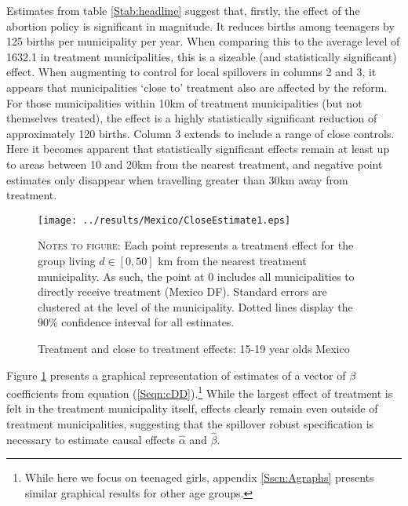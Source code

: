 \documentclass{article}
\begin{document}
\begin{spacing}{1.1}


Estimates from table \ref{Stab:headline} suggest that, firstly, the effect of
the abortion policy is significant in magnitude.  It reduces births among 
teenagers by 125 births per municipality per year. When comparing this to the
average level of 1632.1 in treatment municipalities, this is a sizeable (and
statistically significant) effect.  When augmenting to control for local
spillovers in columns 2 and 3, it appears that municipalities `close to' 
treatment also are affected by the reform.  For those municipalities within
10km of treatment municipalities (but not themselves treated), the effect is 
a highly statistically significant reduction of approximately 120 births.
Column 3 extends to include a range of close controls.  Here it becomes
apparent that statistically significant effects remain at least up to areas
between 10 and 20km from the nearest treatment, and negative point estimates
only disappear when travelling greater than 30km away from treatment.

\begin{figure}[htpb!]
\texttt{[image: ../results/Mexico/CloseEstimate1.eps]}
\caption{Treatment and close to treatment effects: 15-19 year olds Mexico}
\label{SFig:MexClose}
\vspace{2mm}
\begin{footnotesize}
\textsc{Notes to figure}: Each point represents a treatment effect for the group
living $d\in [0,50]$ km from the nearest treatment municipality.  As such, the
point at 0 includes all municipalities to directly receive treatment (Mexico DF).
Standard errors are clustered at the level of the municipality.  Dotted lines 
display the 90\% confidence interval for all estimates.
\end{footnotesize}
\end{figure}
Figure \ref{SFig:MexClose} presents a graphical representation of estimates
of a vector of $\beta$ coefficients from equation (\ref{Seqn:cDD}).\footnote{
While here we focus on teenaged girls, appendix \ref{Sscn:Agraphs} presents
similar graphical results for other age groups.}  While the largest effect of 
treatment is felt in the treatment municipality itself, effects clearly remain 
even outside of treatment municipalities, suggesting that the spillover robust 
specification is necessary to estimate causal effects $\hat\alpha$ and 
$\hat\beta$.


\end{spacing}
\end{document}
